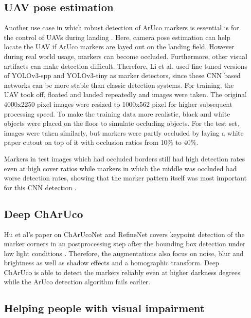 \documentclass[10pt]{book}
\begin{document}
\subsection{UAV pose estimation}

Another use case in which robust detection of \ac{ArUco} markers is essential is for the control of \acp{UAV} during landing \cite{li2020aruco}. Here, camera pose estimation can help locate the \ac{UAV} if \ac{ArUco} markers are layed out on the landing field. However during real world usage, markers can become occluded. Furthermore, other visual artifacts can make detection difficult. Therefore, Li et al. used fine tuned versions of \ac{YOLO}v3-spp and \ac{YOLO}v3-tiny as marker detectors, since these \ac{CNN} based networks can be more stable than classic detection systems. For training, the \ac{UAV} took off, floated and landed repeatedly and images were taken. The original 4000x2250 pixel images were resized to 1000x562 pixel for higher subsequent processing speed. To make the training data more realistic, black and white objects were placed on the floor to simulate occluding objects. For the test set, images were taken similarly, but markers were partly occluded by laying a white paper cutout on top of it with occlusion ratios from 10\% to 40\%. 

Markers in test images which had occluded borders still had high detection rates even at high cover ratios while markers in which the middle was occluded had worse detection rates, showing that the marker pattern itself was most important for this \ac{CNN} detection \cite{li2020aruco}.

\subsection{Deep ChArUco}

Hu et al's paper on ChArUcoNet and RefineNet covers keypoint detection of the marker corners in an postprocessing step after the bounding box detection under low light conditions \cite{hu2019deep}. Therefore, the augmentations also focus on noise, blur and brightness as well as shadow effects and a homographic transform. Deep ChArUco is able to detect the markers reliably even at higher darkness degrees while the \ac{ArUco} detection algorithm fails earlier. 

\subsection{Helping people with visual impairment}
\end{document}
